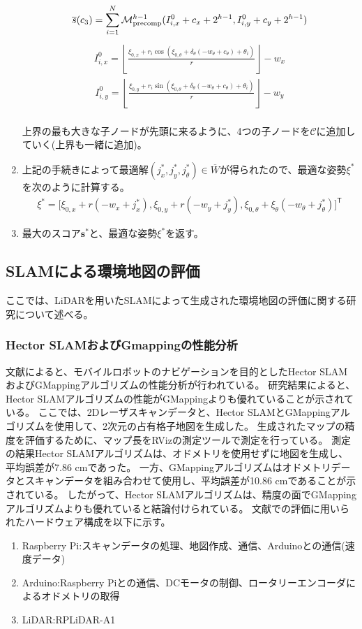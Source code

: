 \begin{enumerate}
\begin{align*}
    \overline{s}(c_3) = \sum_{i=1}^{N}\mathcal{M}_{\rm{precomp}}^{h-1}(I_{i,x}^{0}+c_x+2^{h-1},I_{i,y}^{0}+c_y+2^{h-1})  
  \end{align*}
  \begin{align*}
    I_{i,x}^0 = \left\lfloor \frac{\xi_{0,x}+r_i\cos(\xi_{0,\theta}+\delta_{\theta}(-w_{\theta}+c_{\theta})+\theta_i)}{r}\right\rfloor -w_x
  \end{align*}
  \begin{align*}
    I_{i,y}^0 = \left\lfloor \frac{\xi_{0,y}+r_i\sin(\xi_{0,\theta}+\delta_{\theta}(-w_{\theta}+c_{\theta})+\theta_i)}{r}\right\rfloor -w_y
  \end{align*}
  \\
  上界の最も大きな子ノードが先頭に来るように、4つの子ノードを$\mathcal{C}$に追加していく(上界も一緒に追加)。
  \item 上記の手続きによって最適解$(j_x^{*},j_y^{*},j_{\theta}^{*})\in\overline{W}$が得られたので、最適な姿勢$\xi^{*}$を次のように計算する。\\
  \begin{align*}
    \xi^{*} = \bigl[\xi_{0,x}+r(-w_x+j_x^{*}),\xi_{0,y}+r(-w_y+j_y^{*}),\xi_{0,\theta}+\xi_{\theta}(-w_{\theta}+j_{\theta}^{*})\bigr]^{\mathsf{T}}
  \end{align*}
  \item 最大のスコア$\bm{s}^{*}$と、最適な姿勢$\xi^{*}$を返す。
\end{enumerate}

\subsection{SLAMによる環境地図の評価}
ここでは、LiDARを用いたSLAMによって生成された環境地図の評価に関する研究について述べる。

\subsubsection{Hector SLAMおよびGmappingの性能分析}
文献\cite{slam:comp1}によると、モバイルロボットのナビゲーションを目的としたHector SLAMおよびGMappingアルゴリズムの性能分析が行われている。
研究結果によると、Hector SLAMアルゴリズムの性能がGMappingよりも優れていることが示されている。
ここでは、2Dレーザスキャンデータと、Hector SLAMとGMappingアルゴリズムを使用して、2次元の占有格子地図を生成した。
生成されたマップの精度を評価するために、マップ長をRVizの測定ツールで測定を行っている。
測定の結果Hector SLAMアルゴリズムは、オドメトリを使用せずに地図を生成し、平均誤差が7.86 cmであった。
一方、GMappingアルゴリズムはオドメトリデータとスキャンデータを組み合わせて使用し、平均誤差が10.86 cmであることが示されている。
したがって、Hector SLAMアルゴリズムは、精度の面でGMappingアルゴリズムよりも優れていると結論付けられている。
文献での評価に用いられたハードウェア構成を以下に示す。
\begin{enumerate}
  \item Raspberry Pi:スキャンデータの処理、地図作成、通信、Arduinoとの通信(速度データ)
  \item Arduino:Raspberry Piとの通信、DCモータの制御、ロータリーエンコーダによるオドメトリの取得
  \item LiDAR:RPLiDAR-A1
\end{enumerate}

